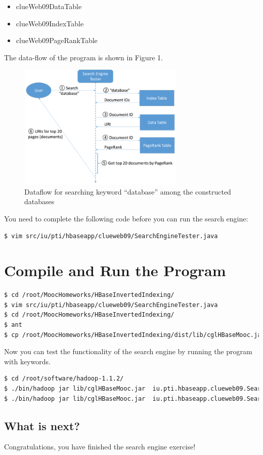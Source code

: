 \begin{itemize}
\item clueWeb09DataTable
\item clueWeb09IndexTable
\item clueWeb09PageRankTable
\end{itemize}

The data-flow of the program is shown in Figure 1.

\begin{figure}[!htbp]
\includegraphics[width=8cm,height=6cm]{section/icloud/assignment/problems/project6/p6}
\centering
\caption{Dataflow for searching keyword ``database'' among the constructed databases}
\end{figure}

You need to complete the following code before you can run the search engine:
\begin{lstlisting}[language=bash]
$ vim src/iu/pti/hbaseapp/clueweb09/SearchEngineTester.java
\end{lstlisting}



\section*{Compile and Run the Program}
\begin{lstlisting}[language=bash]
$ cd /root/MoocHomeworks/HBaseInvertedIndexing/
$ vim src/iu/pti/hbaseapp/clueweb09/SearchEngineTester.java
$ cd /root/MoocHomeworks/HBaseInvertedIndexing/
$ ant
$ cp /root/MoocHomeworks/HBaseInvertedIndexing/dist/lib/cglHBaseMooc.jar /root/software/hadoop-1.1.2/lib/
\end{lstlisting}

Now you can test the functionality of the search engine by running the program
with keywords.

\begin{lstlisting}[language=bash]
$ cd /root/software/hadoop-1.1.2/
$ ./bin/hadoop jar lib/cglHBaseMooc.jar  iu.pti.hbaseapp.clueweb09.SearchEngineTester search-keyword snapshot
$ ./bin/hadoop jar lib/cglHBaseMooc.jar  iu.pti.hbaseapp.clueweb09.SearchEngineTester get-page-snapshot 00000113548 |  grep snapshot
\end{lstlisting}

\subsection*{What is next?}
Congratulations, you have finished the search engine exercise!

